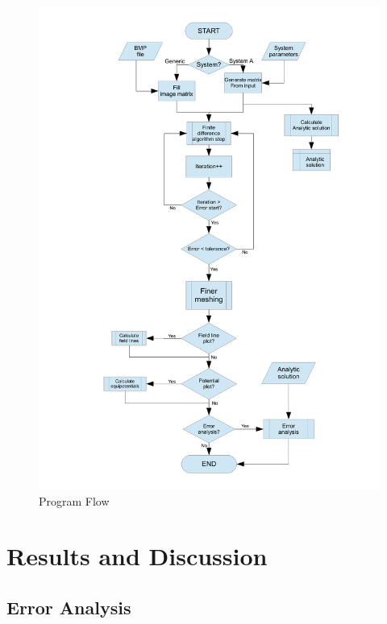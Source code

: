 \documentclass[a4paper]{jpconf}
\begin{document}
\begin{figure}[h]
	\centering
	\includegraphics[width=12cm]{progflow} 
	\caption{Program Flow}
	\label{fig:prog}
\end{figure}

\section*{Results and Discussion}
%
%

\subsection*{Error Analysis}
%
%
\end{document}

